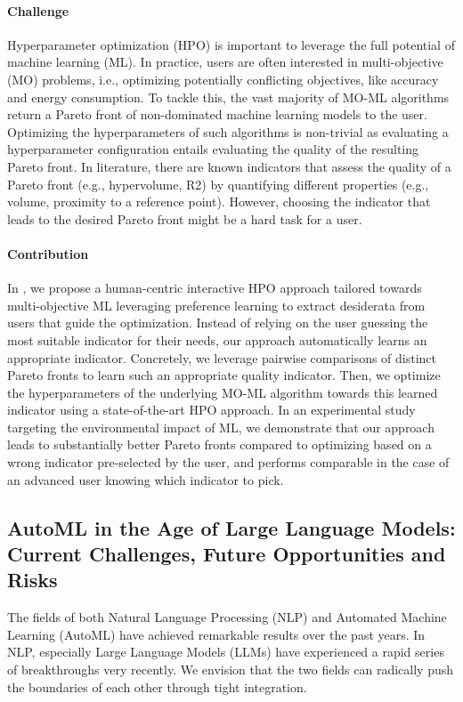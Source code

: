 \paragraph{Challenge} Hyperparameter optimization (HPO) is important to leverage the full potential of machine learning (ML).
In practice, users are often interested in multi-objective (MO) problems, i.e., optimizing potentially conflicting objectives, like accuracy and energy consumption.
To tackle this, the vast majority of MO-ML algorithms return a Pareto front of non-dominated machine learning models to the user.
Optimizing the hyperparameters of such algorithms is non-trivial as evaluating a hyperparameter configuration entails evaluating the quality of the resulting Pareto front.
In literature, there are known indicators that assess the quality of a Pareto front (e.g., hypervolume, R2) by quantifying different properties (e.g., volume, proximity to a reference point).
However, choosing the indicator that leads to the desired Pareto front might be a hard task for a user.

\paragraph{Contribution} In , we propose a human-centric interactive HPO approach tailored towards multi-objective ML leveraging preference learning to extract desiderata from users that guide the optimization.
Instead of relying on the user guessing the most suitable indicator for their needs, our approach automatically learns an appropriate indicator.
Concretely, we leverage pairwise comparisons of distinct Pareto fronts to learn such an appropriate quality indicator.
Then, we optimize the hyperparameters of the underlying MO-ML algorithm towards this learned indicator using a state-of-the-art HPO approach.
In an experimental study targeting the environmental impact of ML, we demonstrate that our approach leads to substantially better Pareto fronts compared to optimizing based on a wrong indicator pre-selected by the user, and performs comparable in the case of an advanced user knowing which indicator to pick.


\subsection*{AutoML in the Age of Large Language Models: Current Challenges, Future Opportunities and Risks}

The fields of both Natural Language Processing (NLP) and Automated Machine Learning (AutoML) have achieved remarkable results over the past years.
In NLP, especially Large Language Models (LLMs) have experienced a rapid series of breakthroughs very recently.
We envision that the two fields can radically push the boundaries of each other through tight integration.

